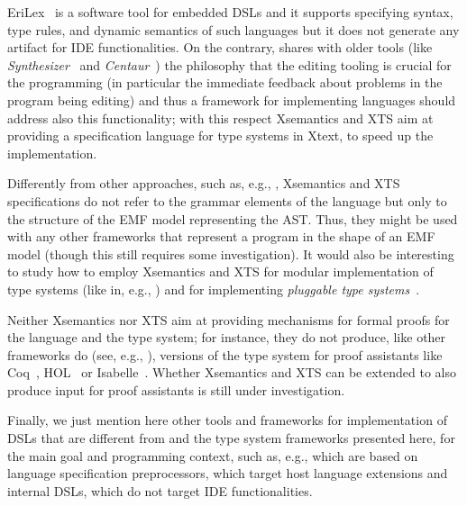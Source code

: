 EriLex~\cite{EriLex} is a software tool for embedded DSLs and it supports
specifying syntax, type rules, and dynamic semantics of such languages but it
does not generate any artifact for IDE functionalities.
On the contrary, \xtext{} shares with older tools (like
\emph{Synthesizer}~\cite{Synthesizer} and \emph{Centaur}~\cite{Centaur}) the
philosophy that the editing tooling is crucial for the programming (in
particular the immediate feedback about problems in the program being editing)
and thus a framework for implementing languages should address also this
functionality; with this respect Xsemantics and XTS aim at providing a
specification language for type systems in Xtext, to speed up the
implementation.

Differently from other approaches, such as, e.g.,
\cite{Centaur,MPS,ASFSDF,Ruler,PLTRedex,EriLex,Neverlang2010}, Xsemantics and
XTS specifications do not refer to the grammar elements of the language but only
to the structure of the EMF model representing the AST.  Thus, they might be
used with any other frameworks that represent a program in the shape of an EMF
model (though this still requires some investigation).
It would also be interesting to study how to employ Xsemantics and XTS for
modular implementation of type systems (like in, e.g.,
\cite{JastAdd,Neverlang2010,Spoofax2010}) and for implementing \emph{pluggable
type systems}~\cite{Brac04a}.

Neither Xsemantics nor XTS aim at providing mechanisms for formal proofs for the
language and the type system; for instance, they do not produce, like other
frameworks do (see, e.g., \cite{Ott}), versions of the type system for proof
assistants like Coq~\cite{Coq}, HOL~\cite{HOL} or Isabelle~\cite{Isabelle}.
Whether Xsemantics and XTS can be extended to also produce input for proof
assistants is still under investigation.

Finally, we just mention here other tools and frameworks for implementation of
DSLs that are different from \xtext{} and the type system frameworks presented
here, for the main goal and programming context, such as, e.g.,
\cite{JST98,MetaBorg06,MontiCore10} which are based on language specification
preprocessors, \cite{XMF08,LanguageBoxes09} which target host language
extensions and internal DSLs, \cite{ASFSDF,Ruler,PLTRedex} which do not target
IDE functionalities.